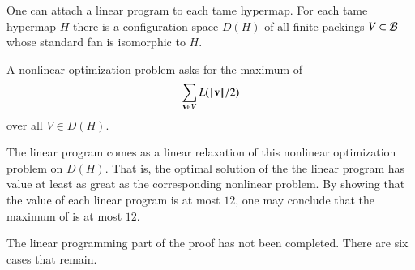 One can attach a linear program to each tame hypermap.
For each tame hypermap $H$ there is a configuration space $D(H)$ of all
finite packings $V\subset {\mathcal B}$ whose standard fan is
isomorphic to $H$.
%
%

A nonlinear optimization problem asks for the maximum of
\begin{equation}\label{eqn:L2}
\sum_{{\mathbf v}\in V} L({{\hskip0.1em|\hskip-0.15em|\hskip0.1em}{\mathbf v}{\hskip0.1em|\hskip-0.15em|\hskip0.1em}}/2)
\end{equation}
over all $V\in D(H)$.

The linear program comes as a linear relaxation of this nonlinear
optimization problem on $D(H)$. That is, the optimal solution of the
the linear program has value at least as great as the corresponding
nonlinear problem.  By showing that the value of each linear program
is at most $12$, one may conclude that the maximum of 
is at most $12$.


\begin{note}%
The linear programming part of the proof has not been completed. There are six cases that remain.
\end{note}

